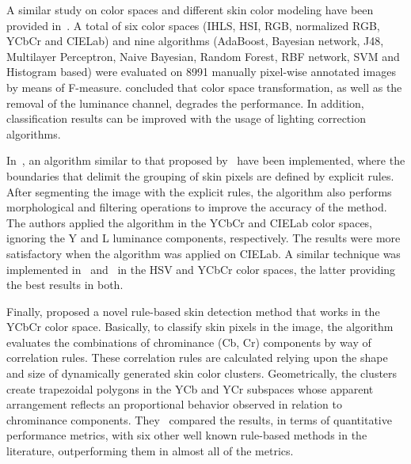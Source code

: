 A similar study on color spaces and different skin color modeling have been provided in~\citet{khan:12}. A total of six color spaces (IHLS, HSI, RGB, normalized RGB, YCbCr and CIELab) and nine algorithms (AdaBoost, Bayesian network, J48, Multilayer Perceptron, Naive Bayesian, Random Forest, RBF network, SVM and Histogram based) were evaluated on 8991 manually pixel-wise annotated images by means of F-measure. \citet{khan:12} concluded that color space transformation, as well as the removal of the luminance channel, degrades the performance. In addition, classification results can be improved with the usage of lighting correction algorithms.

In~\citet{kaur:12}, an algorithm similar to that proposed by~\citet{kovac:03} have been implemented, where the boundaries that delimit the grouping of skin pixels are defined by explicit rules. After segmenting the image with the explicit rules, the algorithm also performs morphological and filtering operations to improve the accuracy of the method. The authors applied the algorithm in the YCbCr and CIELab color spaces, ignoring the Y and L luminance components, respectively. The results were more satisfactory when the algorithm was applied on CIELab. A similar technique was implemented in~\citet{shaik:15} and~\citet{kumar:15} in the HSV and YCbCr color spaces, the latter providing the best results in both.

Finally, \citet{brancati:17} proposed a novel rule-based skin detection method that works in the YCbCr color space. Basically, to classify skin pixels in the image, the algorithm evaluates the combinations of chrominance (Cb, Cr) components by way of correlation rules. These correlation rules are calculated relying upon the shape and size of dynamically generated skin color clusters. Geometrically, the clusters create trapezoidal polygons in the YCb and YCr subspaces whose apparent arrangement reflects an proportional behavior observed in relation to chrominance components. They~\citep{brancati:17} compared the results, in terms of quantitative performance metrics, with six other well known rule-based methods in the literature, outperforming them in almost all of the metrics.
